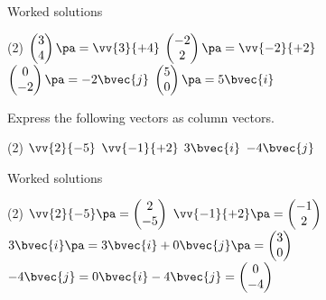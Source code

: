 \begin{frame}[t]{Worked solutions}\small
\begin{sol}
\begin{tasks}(2)
\task $\begin{pmatrix}3 \\ 4\end{pmatrix} \pa = \vv{3}{+4}$ \pa
\task $\begin{pmatrix}-2 \\ 2\end{pmatrix} \pa= \vv{-2}{+2}$ \pa
\task $\begin{pmatrix}0 \\ -2\end{pmatrix} \pa= -2 \bvec{j}$ \pa
\task $\begin{pmatrix}5 \\ 0\end{pmatrix} \pa = 5\bvec{i}$
\end{tasks}
\end{sol}
\end{frame}


\begin{frame}[t]
\begin{ex}{}
Express the following vectors as column vectors.
\begin{tasks}(2)
\task $\vv{2}{-5} $
\task $\vv{-1}{+2}$
\task $3\bvec{i}$
\task $-4\bvec{j}$
\end{tasks}
\end{ex}
\end{frame}

\begin{frame}[t]{Worked solutions}\small
\begin{sol}
\begin{tasks}(2)
\task $\vv{2}{-5} \pa = \begin{pmatrix}2 \\ -5\end{pmatrix}$ \pa
\task $\vv{-1}{+2} \pa = \begin{pmatrix}-1 \\ 2\end{pmatrix}$ \pa
\task $3\bvec{i} \pa = 3\bvec{i} + 0\bvec{j} \pa = \begin{pmatrix}3 \\ 0\end{pmatrix}$ \pa
\task $-4\bvec{j} = 0\bvec{i} - 4\bvec{j} = \begin{pmatrix}0 \\ -4\end{pmatrix}$
\end{tasks}
\end{sol}
\end{frame}

